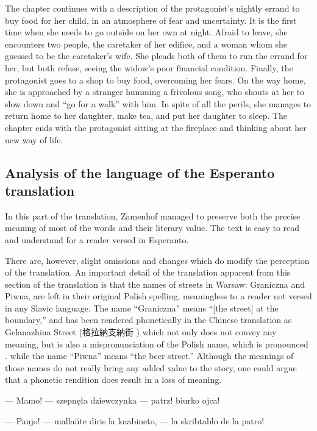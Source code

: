 The chapter continues with a description of the protagonist's nightly errand to buy food for her child, in an atmosphere of fear and uncertainty.
It is the first time when she needs to go outside on her own at night.
Afraid to leave, she encounters two people, the caretaker of her edifice, and a woman whom she guessed to be the caretaker's wife.
She pleads both of them to run the errand for her, but both refuse, seeing the widow's poor financial condition.
Finally, the protagonist goes to a shop to buy food, overcoming her fears.
On the way home, she is approached by a stranger humming a frivolous song, who shouts at her to slow down and ``go for a walk'' with him.
In spite of all the perils, she manages to return home to her daughter, make tea, and put her daughter to sleep.
The chapter ends with the protagonist sitting at the fireplace and thinking about her new way of life.

\subsection{Analysis of the language of the Esperanto translation}

In this part of the translation, Zamenhof managed to preserve both the precise meaning of most of the words and their literary value. The text is easy to read and understand for a reader versed in Esperanto.

There are, however, slight omissions and changes which do modify the perception of the translation.
An important detail of the translation apparent from this section of the translation is that the names of streets in Warsaw: Graniczna and Piwna, are left in their original Polish spelling, meaningless to a reader not versed in any Slavic language. %
The name ``Graniczna'' means ``[the street] at the boundary,'' and has been rendered phonetically in the Chinese translation as Gelanazhina Street (格拉納支納街 ) which not only does not convey any meaning, but is also a mispronunciation of the Polish name, which is pronounced \ipa{[ɡrãˈɲiʧ̑na]}.
while the name ``Piwna'' means ``the beer street.''
Although the meanings of those names do not really bring any added value to the story, one could argue that a phonetic rendition does result in a loss of meaning.

--- Mamo! --- szepnęła dziewczynka --- patrz! biurko ojca!

--- Panjo! --- mallaŭte diris la knabineto, --- la skribtablo de la patro!


